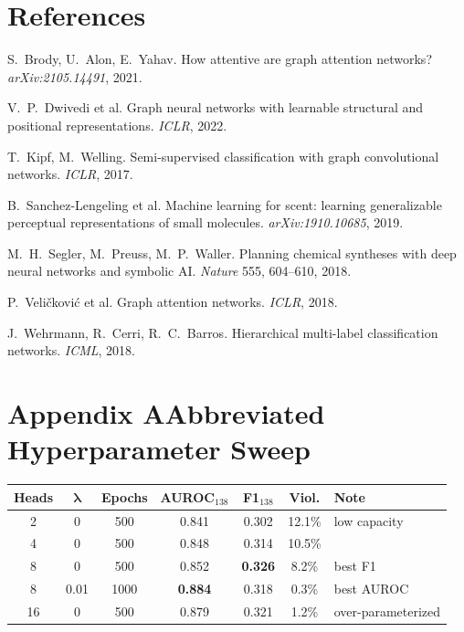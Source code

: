\documentclass[10pt,twocolumn]{article}
\begin{document}
\section*{References}
\small
\begin{enumerate}[leftmargin=1.4em,itemsep=1pt,label={[\arabic*]}]
  \item S.~Brody, U.~Alon, E.~Yahav. How attentive are graph attention networks? \emph{arXiv:2105.14491}, 2021.
  \item V.~P.~Dwivedi et al. Graph neural networks with learnable structural and positional representations. \emph{ICLR}, 2022.
  \item T.~Kipf, M.~Welling. Semi-supervised classification with graph convolutional networks. \emph{ICLR}, 2017.
  \item B.~Sanchez-Lengeling et al. Machine learning for scent: learning generalizable perceptual representations of small molecules. \emph{arXiv:1910.10685}, 2019.
  \item M.~H.~Segler, M.~Preuss, M.~P.~Waller. Planning chemical syntheses with deep neural networks and symbolic AI. \emph{Nature} 555, 604--610, 2018.
  \item P.~Veli\v{c}kovi\'c et al. Graph attention networks. \emph{ICLR}, 2018.
  \item J.~Wehrmann, R.~Cerri, R.~C.~Barros. Hierarchical multi-label classification networks. \emph{ICML}, 2018.
\end{enumerate}

\onecolumn
\appendix
\section*{Appendix A\quad Abbreviated Hyperparameter Sweep}
\small
\begin{table}[h]
\centering
\begin{tabular}{ccccccl}
\toprule
\textbf{Heads} & $\boldsymbol{\lambda}$ & \textbf{Epochs} & \textbf{AUROC$_{138}$} & \textbf{F1$_{138}$} & \textbf{Viol.} & \textbf{Note} \\
\midrule
2  & 0    & 500  & 0.841 & 0.302 & 12.1\% & low capacity \\
4  & 0    & 500  & 0.848 & 0.314 & 10.5\% & \\
8  & 0    & 500  & 0.852 & \textbf{0.326} & 8.2\%  & best F1 \\
8  & 0.01 & 1000 & \textbf{0.884} & 0.318 & 0.3\%  & best AUROC \\
16 & 0    & 500  & 0.879 & 0.321 & 1.2\%  & over-parameterized \\
\bottomrule
\end{tabular}
\end{table}
\end{document}
